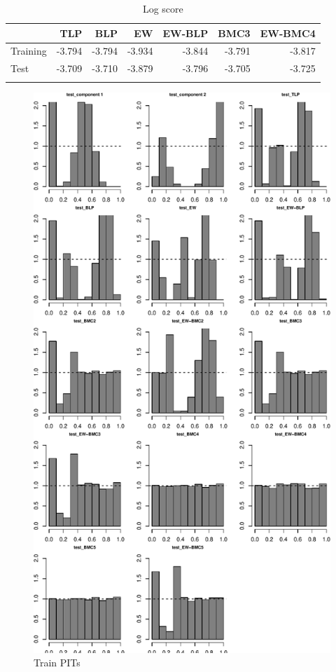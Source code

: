 \documentclass[
]{article}
\begin{document}
\begin{table}[H]
\caption{\label{tab:unnamed-chunk-19}Log score}

\centering
\fontsize{8}{10}\selectfont
\begin{tabular}[t]{lrrrrrr}
\toprule{}
  & TLP & BLP & EW & EW-BLP & BMC3 & EW-BMC4\\
\midrule{}
Training & -3.794 & -3.794 & -3.934 & -3.844 & -3.791 & -3.817\\
Test & -3.709 & -3.710 & -3.879 & -3.796 & -3.705 & -3.725\\
\bottomrule{}
\end{tabular}
\end{table}

\begin{figure}[h]

{\centering \includegraphics{applied_blp_sim_files/figure-latex/unnamed-chunk-20-1} 

}

\caption{Train PITs}\label{fig:unnamed-chunk-20}
\end{figure}
\end{document}
